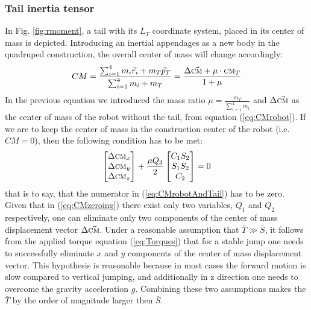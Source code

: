 \subsubsection{Tail inertia tensor}
In Fig. \ref{fig:rmoment}, a tail with its ${L_T}$ coordinate system, placed in its center of mass is depicted. Introducing an inertial appendages as a new body in the quadruped construction, the overall center of mass will change accordingly:
\begin{equation}\label{eq:CMrobotAndTail}
CM=\frac{\sum_{i=1}^{4}m_i\vec{r}_i+m_T\vec{p}_T}{\sum_{i=1}^{4}m_i+m_T}= \frac{\Delta\vec{\textsc{cm}}+\mu\cdot\textsc{cm}_T}{1+\mu}
\end{equation}
In the previous equation we introduced the mass ratio $\mu=\frac{m_T}{\sum_{i=1}^{4}m_i}$ and $\Delta\vec{\textsc{cm}}$ as the center of mass of the robot without the tail, from equation (\ref{eq:CMrobot}). If we are to keep the center of mass in the construction center of the robot (i.e. $CM=0$), then the following condition has to be met:
\begin{equation}\label{eq:CMzeroing}
\begin{bmatrix}
\Delta \textsc{cm}_x\\ 
\Delta \textsc{cm}_y\\ 
\Delta \textsc{cm}_z
\end{bmatrix}+
\frac{\mu Q_3}{2}\begin{bmatrix}
C_1S_2\\ 
S_1S_2\\ 
C_2
\end{bmatrix}=0
\end{equation}
that is to say, that the numerator in (\ref{eq:CMrobotAndTail}) has to be zero. Given that in (\ref{eq:CMzeroing}) there exist only two variables, $Q_1$ and $Q_2$ respectively, one can eliminate only two components of the center of mass displacement vector $\Delta \vec{\textsc{cm}}$. Under a reasonable assumption that $\bar{T}\gg \bar{S}$, it follows from the applied torque equation (\ref{eq:Torques}) that for a stable jump one needs to successfully eliminate $x$ and $y$ components of the center of mass displacement vector. This hypothesis is reasonable because in most cases the forward motion is slow compared to vertical jumping, and additionally in z direction one needs to overcome the gravity acceleration $g$. Combining these two assumptions makes the $\bar{T}$ by the order of magnitude larger then $\bar{S}$.

